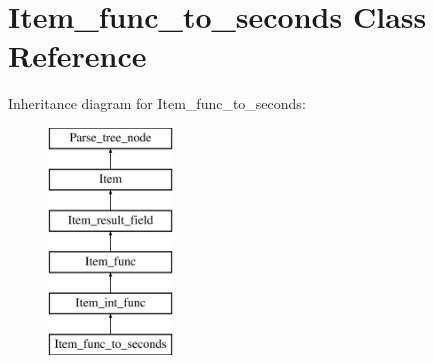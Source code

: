 \hypertarget{classItem__func__to__seconds}{}\section{Item\+\_\+func\+\_\+to\+\_\+seconds Class Reference}
\label{classItem__func__to__seconds}
Inheritance diagram for Item\+\_\+func\+\_\+to\+\_\+seconds\+:\begin{figure}[H]
\begin{center}
\leavevmode
\includegraphics[height=6.000000cm]{classItem__func__to__seconds}
\end{center}
\end{figure}
